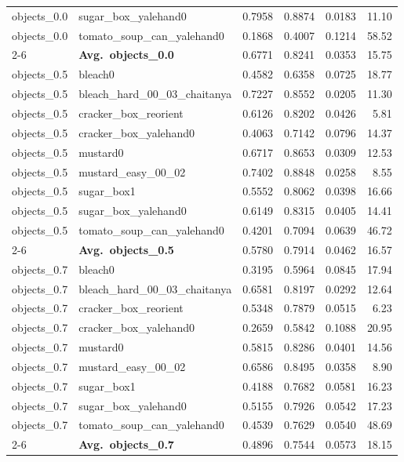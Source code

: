 \begin{longtable}{llrrrr}
  objects_0.0 & sugar\_box\_yalehand0 & 0.7958 & 0.8874 & 0.0183 & 11.10 \\
  objects_0.0 & tomato\_soup\_can\_yalehand0 & 0.1868 & 0.4007 & 0.1214 & 58.52 \\
  \cmidrule{2-6}
  & \textbf{Avg.~objects_0.0} & 0.6771 & 0.8241 & 0.0353 & 15.75 \\
  \midrule
  objects_0.5 & bleach0 & 0.4582 & 0.6358 & 0.0725 & 18.77 \\
  objects_0.5 & bleach\_hard\_00\_03\_chaitanya & 0.7227 & 0.8552 & 0.0205 & 11.30 \\
  objects_0.5 & cracker\_box\_reorient & 0.6126 & 0.8202 & 0.0426 & 5.81 \\
  objects_0.5 & cracker\_box\_yalehand0 & 0.4063 & 0.7142 & 0.0796 & 14.37 \\
  objects_0.5 & mustard0 & 0.6717 & 0.8653 & 0.0309 & 12.53 \\
  objects_0.5 & mustard\_easy\_00\_02 & 0.7402 & 0.8848 & 0.0258 & 8.55 \\
  objects_0.5 & sugar\_box1 & 0.5552 & 0.8062 & 0.0398 & 16.66 \\
  objects_0.5 & sugar\_box\_yalehand0 & 0.6149 & 0.8315 & 0.0405 & 14.41 \\
  objects_0.5 & tomato\_soup\_can\_yalehand0 & 0.4201 & 0.7094 & 0.0639 & 46.72 \\
  \cmidrule{2-6}
  & \textbf{Avg.~objects_0.5} & 0.5780 & 0.7914 & 0.0462 & 16.57 \\
  \midrule
  objects_0.7 & bleach0 & 0.3195 & 0.5964 & 0.0845 & 17.94 \\
  objects_0.7 & bleach\_hard\_00\_03\_chaitanya & 0.6581 & 0.8197 & 0.0292 & 12.64 \\
  objects_0.7 & cracker\_box\_reorient & 0.5348 & 0.7879 & 0.0515 & 6.23 \\
  objects_0.7 & cracker\_box\_yalehand0 & 0.2659 & 0.5842 & 0.1088 & 20.95 \\
  objects_0.7 & mustard0 & 0.5815 & 0.8286 & 0.0401 & 14.56 \\
  objects_0.7 & mustard\_easy\_00\_02 & 0.6586 & 0.8495 & 0.0358 & 8.90 \\
  objects_0.7 & sugar\_box1 & 0.4188 & 0.7682 & 0.0581 & 16.23 \\
  objects_0.7 & sugar\_box\_yalehand0 & 0.5155 & 0.7926 & 0.0542 & 17.23 \\
  objects_0.7 & tomato\_soup\_can\_yalehand0 & 0.4539 & 0.7629 & 0.0540 & 48.69 \\
  \cmidrule{2-6}
  & \textbf{Avg.~objects_0.7} & 0.4896 & 0.7544 & 0.0573 & 18.15 \\

\end{longtable}

